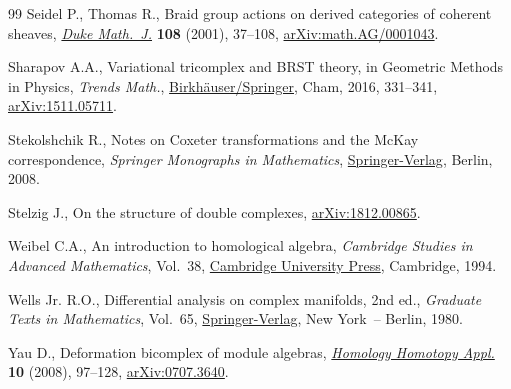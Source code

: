 \begin{thebibliography}{99}
Seidel P., Thomas R., Braid group actions on derived categories of coherent
 sheaves, \href{https://doi.org/10.1215/S0012-7094-01-10812-0}{\textit{Duke Math.~J.}} \textbf{108} (2001), 37--108,
 \href{https://arxiv.org/abs/math.AG/0001043}{arXiv:math.AG/0001043}.

Sharapov A.A., Variational tricomplex and {BRST} theory, in Geometric Methods
 in Physics, \textit{Trends Math.}, \href{https://doi.org/10.1007/978-3-319-31756-4_26}{Birkh\"auser/Springer}, Cham, 2016, 331--341, \href{https://arxiv.org/abs/1511.05711}{arXiv:1511.05711}.

Stekolshchik R., Notes on {C}oxeter transformations and the {M}c{K}ay
 correspondence, \textit{Springer Monographs in Mathematics}, \href{https://doi.org/10.1007/978-3-540-77399-3}{Springer-Verlag}, Berlin,
 2008.

Stelzig J., On the structure of double complexes, \href{https://arxiv.org/abs/1812.00865}{arXiv:1812.00865}.

Weibel C.A., An introduction to homological algebra, \textit{Cambridge Studies
 in Advanced Mathematics}, Vol.~38, \href{https://doi.org/10.1017/CBO9781139644136}{Cambridge University Press}, Cambridge, 1994.

Wells Jr. R.O., Differential analysis on complex manifolds, 2nd ed., \textit{Graduate
 Texts in Mathematics}, Vol.~65, \href{https://doi.org/10.1007/978-0-387-73892-5}{Springer-Verlag}, New York~-- Berlin, 1980.

Yau D., Deformation bicomplex of module algebras, \href{https://doi.org/10.4310/HHA.2008.v10.n1.a5}{\textit{Homology Homotopy
 Appl.}} \textbf{10} (2008), 97--128, \href{https://arxiv.org/abs/0707.3640}{arXiv:0707.3640}.

\end{thebibliography}
